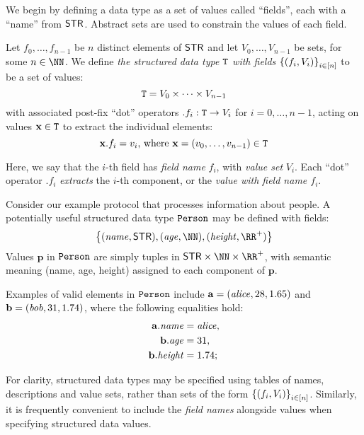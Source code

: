 We begin by defining a data type as a set of values called ``fields'', each with a ``name'' from $\mathsf{STR}$. Abstract sets are used to constrain the values of each field.

\begin{definition}\label{preliminaries:def:datatype}
  Let $f_0, \ldots, f_{n-1}$ be $n$ distinct elements of $\mathsf{STR}$ and let $V_0, \ldots, V_{n-1}$ be sets, for some $n \in \NN$. We define \emph{the structured data type ${\mathtt{T}}$ with fields $\left\{{(f_i, V_i)}\right\}_{i \in [n]}$} to be a set of values:
  \[
    {\mathtt{T}} = V_0 \times \cdots \times V_{n-1}
  \]
  with associated post-fix ``dot'' operators $.f_i : {\mathtt{T}} \to V_i$ for $i = 0, \ldots, n-1$, acting on values $\mathbf{x} \in {\mathtt{T}}$ to extract the individual elements:
  \[
    \mathbf{x}.f_i = v_i \text{, where } \mathbf{x} = (v_0, \ldots, v_{n-1}) \in {\mathtt{T}}
  \]

  Here, we say that the $i$-th field has \emph{field name} $f_i$, with \emph{value set} $V_i$. Each ``dot'' operator $.f_i$ \emph{extracts} the $i$-th component, or the \emph{value with field name $f_i$}.
\end{definition}

\begin{example}\label{preliminaries:eg:datatype-person}
  Consider our example protocol that processes information about people. A potentially useful structured data type ${\mathtt{Person}}$ may be defined with fields:
  \[
    \smallset{ (\varstyle{name}, \STR), (\varstyle{age}, \NN), (\varstyle{height}, \RR^+) }
  \]
  Values $\mathbf{p}$ in ${\mathtt{Person}}$ are simply tuples in $\STR{} \times \NN \times \RR^+$, with semantic meaning (name, age, height) assigned to each component of $\mathbf{p}$.

  Examples of valid elements in ${\mathtt{Person}}$ include $\mathbf{a} = (\mathit{alice}, 28, 1.65)$ and $\mathbf{b} = (\mathit{bob}, 31, 1.74)$, where the following equalities hold:
  \begin{align*}
    \mathbf{a}.\mathit{name} &= \mathit{alice}, \\
    \mathbf{b}.\mathit{age} &= 31, \\
    \mathbf{b}.\mathit{height} &= 1.74;
  \end{align*}
\end{example}

For clarity, structured data types may be specified using tables of names, descriptions and value sets, rather than sets of the form $\left\{{(f_i, V_i)}\right\}_{i \in [n]}$. Similarly, it is frequently convenient to include the \emph{field names} alongside values when specifying structured data values.

